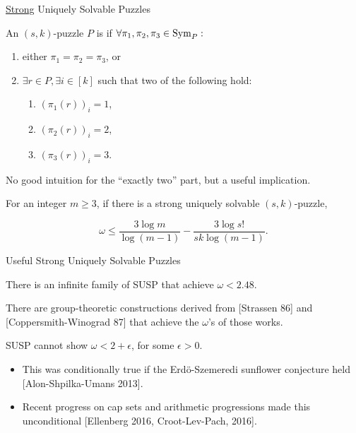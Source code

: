 \documentclass[t,10pt,
mathserif,xcolor=dvipsnames]{beamer}
\begin{document}
\begin{myframe}{\uline{Strong} Uniquely Solvable Puzzles}

  \begin{definition}

    An $(s,k)$-puzzle $P$ is \emph{} if
    $\forall \pi_1, \pi_2, \pi_3 \in \mathrm{Sym}_{P}:$
    \begin{enumerate}
    \item either $\pi_1 = \pi_2 = \pi_3$, or
    \item $\exists r \in P, \exists i \in [k]$ such that  two
      of the following hold:
      \begin{enumerate}
      \item $(\pi_1(r))_i = 1$,
      \item $(\pi_2(r))_i = 2$,
      \item $(\pi_3(r))_i = 3$.
      \end{enumerate}
    \end{enumerate}

  \end{definition}

  \pause
  
  No good intuition for the ``exactly two'' part, but a useful
  implication.

  \begin{lemma}
    For an integer $m \ge 3$, if there is a strong uniquely solvable
    $(s,k)$-puzzle, 

    $$\omega \le \frac{3 \log m}{\log(m-1)} - \frac{3 \log s!}{sk \log(m-1)}.$$
  \end{lemma}
  
\end{myframe}

\begin{myframe}{Useful Strong Uniquely Solvable Puzzles}

  \begin{lemma}
   There is an infinite family of SUSP that achieve $\omega < 2.48$.
  \end{lemma}

  \medskip
  There are group-theoretic constructions derived from [Strassen 86]
  and [Coppersmith-Winograd 87] that achieve the $\omega$'s of those
  works.

  \bigskip

  \pause
  
  \begin{lemma}[{[BCCGU 16]}]
  SUSP cannot show $\omega < 2 + \epsilon$, for some $\epsilon >
  0$.
  \end{lemma}
  \begin{itemize}
  \item This was conditionally true if the Erd\"{o}-Szemeredi
    sunflower conjecture held [Alon-Shpilka-Umans 2013].
  \item Recent progress on cap sets and arithmetic progressions made
    this unconditional [Ellenberg 2016, Croot-Lev-Pach, 2016].
  \end{itemize}

  
\end{myframe}
\end{document}
